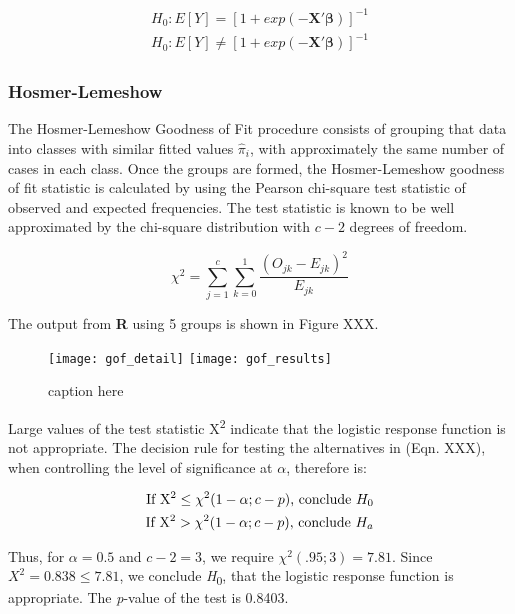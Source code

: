 \begin{align}
\begin{split}
	H_0: E[Y]=  [1+exp(-\textbf{X}'\boldsymbol{\beta})]^{-1} \\
	H_0: E[Y] \neq  [1+exp(-\textbf{X}'\boldsymbol{\beta})]^{-1}
\end{split}
\end{align}

\subsubsection{Hosmer-Lemeshow}
The Hosmer-Lemeshow Goodness of Fit procedure consists of grouping that data into classes with similar fitted values \(\hat{\pi}_i\), with approximately the same number of cases in each class. Once the groups are formed, the Hosmer-Lemeshow goodness of fit statistic is calculated by using the Pearson chi-square test statistic of observed and expected frequencies. The test statistic is known to be well approximated by the chi-square distribution with \(c-2\) degrees of freedom.

\begin{equation}
	\chi^2 = \sum_{j=1}^{c} \sum_{k=0}^{1} \frac{(O_{jk}-E_{jk})^2}{E_{jk}}
\end{equation}

The output from \textbf{R} using 5 groups is shown in Figure XXX.

\begin{figure}[H]
	\centering
	\texttt{[image: gof\_detail]}
	\texttt{[image: gof\_results]}
	\caption{caption here}
\end{figure}

Large values of the test statistic X\textsuperscript{2} indicate that the logistic response function is not appropriate. The decision rule for testing the alternatives in (Eqn. XXX), when controlling the level of significance at \(\alpha\), therefore is:

\begin{align}
\begin{split}
	\textrm{If X\textsuperscript{2}} \leq \chi^2(1-\alpha; c-p)\textrm{, conclude } H_0 \\
	\textrm{If X\textsuperscript{2}} > \chi^2(1-\alpha; c-p)\textrm{, conclude } H_a
\end{split}
\end{align}

Thus, for \(\alpha=0.5\) and \(c-2=3\), we require \(\chi^2(.95; 3)=7.81\). Since \(X^2=0.838\leq7.81\), we conclude \textit{H}\textsubscript{0}, that the logistic response function is appropriate. The \textit{p}-value of the test is 0.8403.

